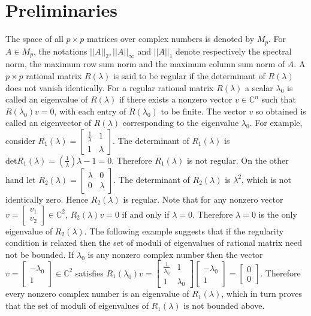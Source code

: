 \documentclass[12pt, reqno]{amsart}
\theoremstyle{definition}
\theoremstyle{remark}
\numberwithin{equation}{section}
\begin{document}
\section{Preliminaries}\hspace*{\fill}
\label{sec-2}

The space of all $p \times p$ matrices over complex numbers is denoted by $M_{p}$. 
For $A \in M_p$, the notations $||A||_2, ||A||_\infty$ and $||A||_1$ denote 
respectively the spectral norm, the maximum row sum norm and the maximum column 
sum norm of $A$. A $p\times p$ rational matrix $R(\lambda)$ is 
said to be regular if the determinant of $R(\lambda)$ does not vanish identically. 
For a regular rational matrix $R(\lambda)$ a scalar $\lambda_0$ is called an 
eigenvalue of $R(\lambda)$ if there exists a nonzero vector $v \in \mathbb{C}^n$ 
such that $R(\lambda_0)v=0$, with each entry of $R(\lambda_0)$ to be finite. 
The vector $v$ so obtained is called an eigenvector of $R(\lambda)$ corresponding 
to the eigenvalue $\lambda_0$. For example, consider $R_1(\lambda)= \begin{bmatrix}
\frac{1}{\lambda} & 1 \\
1 & \lambda
\end{bmatrix}$. The determinant of $R_1(\lambda)$ is $\text{det}R_1(\lambda)= 
(\frac{1}{\lambda}) \lambda -1 =0$. Therefore $R_1(\lambda)$ is not regular. On 
the other hand let $R_2(\lambda)= \begin{bmatrix}
\lambda & 0 \\
0 & \lambda
\end{bmatrix}$. The determinant of $R_2(\lambda)$ is $\lambda^2$, which is not 
identically zero. Hence $R_2(\lambda)$ is regular. Note that for any nonzero vector 
$v =\begin{bmatrix}
v_1 \\
v_2
\end{bmatrix} \in \mathbb{C}^2$, $R_2(\lambda)v=0$ if and only if $\lambda = 0$. 
Therefore $\lambda = 0$ is the only eigenvalue of $R_2(\lambda)$. The following 
example suggests that if the regularity condition is relaxed then the set of 
moduli of eigenvalues of rational matrix need not be bounded. If $\lambda_0$ is 
any nonzero complex number then the vector $v =\begin{bmatrix}
-\lambda_0 \\
1
\end{bmatrix} \in \mathbb{C}^2$ satisfies $R_1(\lambda_0)v= \begin{bmatrix}
\frac{1}{\lambda_0} & 1 \\
1 & \lambda_0
\end{bmatrix} \begin{bmatrix}
-\lambda_0 \\
1
\end{bmatrix} = \begin{bmatrix}
0 \\
0
\end{bmatrix}$. Therefore every nonzero complex number is an eigenvalue of $R_1(\lambda)$,
which in turn proves that the set of moduli of eigenvalues of $R_1(\lambda)$ is not 
bounded above.   
\end{document}
